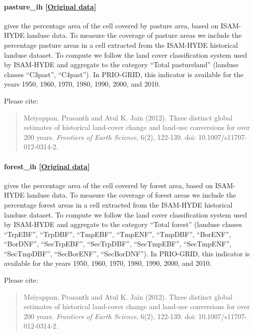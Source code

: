 \documentclass[]{book}
\begin{document}
\paragraph{pasture\_ih
{[}\href{https://www.atmos.illinois.edu/~meiyapp2/datasets.htm}{Original
data}{]}}\label{pasture-ih}

gives the percentage area of the cell covered by pasture area, based on
ISAM-HYDE landuse data. To measure the coverage of pasture areas we
include the percentage pasture areas in a cell extracted from the
ISAM-HYDE historical landuse dataset. To compute  we
follow the land cover classification system used by ISAM-HYDE and
aggregate to the category ``Total pastureland'' (landuse classes
``C3past'', ``C4past''). In PRIO-GRID, this indicator is available for
the years 1950, 1960, 1970, 1980, 1990, 2000, and 2010.

Please cite:

\begin{quote}
Meiyappan, Prasanth and Atul K. Jain (2012). Three distinct global
estimates of historical land-cover change and land-use conversions for
over 200 years. \emph{Frontiers of Earth Science}, 6(2), 122-139. doi:
10.1007/s11707-012-0314-2.
\end{quote}

\paragraph{forest\_ih
{[}\href{https://www.atmos.illinois.edu/~meiyapp2/datasets.htm}{Original
data}{]}}\label{forest-ih}

gives the percentage area of the cell covered by forest area, based on
ISAM-HYDE landuse data. To measure the coverage of forest areas we
include the percentage forest areas in a cell extracted from the
ISAM-HYDE historical landuse dataset. To compute  we
follow the land cover classification system used by ISAM-HYDE and
aggregate to the category ``Total forest'' (landuse classes ``TrpEBF'',
``TrpDBF'', ``TmpEBF'', ``TmpENF'', ``TmpDBF'', ``BorENF'', ``BorDNF'',
``SecTrpEBF'', ``SecTrpDBF'', ``SecTmpEBF'', ``SecTmpENF'',
``SecTmpDBF'', ``SecBorENF'', ``SecBorDNF''). In PRIO-GRID, this
indicator is available for the years 1950, 1960, 1970, 1980, 1990, 2000,
and 2010.

Please cite:

\begin{quote}
Meiyappan, Prasanth and Atul K. Jain (2012). Three distinct global
estimates of historical land-cover change and land-use conversions for
over 200 years. \emph{Frontiers of Earth Science}, 6(2), 122-139. doi:
10.1007/s11707-012-0314-2.
\end{quote}
\end{document}
